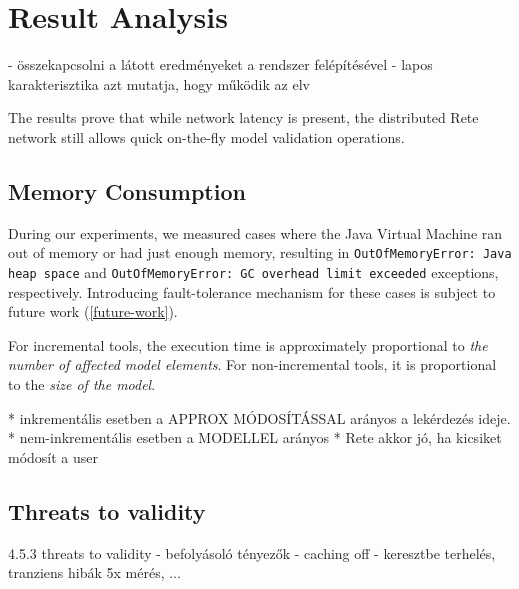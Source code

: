  






 



\section{Result Analysis}



- összekapcsolni a látott eredményeket a rendszer felépítésével
- lapos karakterisztika azt mutatja, hogy működik az elv

The results prove that while network latency is present, the distributed Rete network still allows quick on-the-fly model validation operations. 

\subsection{Memory Consumption}

During our experiments, we measured cases where the Java Virtual Machine ran out of memory or had just enough memory, resulting in \texttt{OutOfMemoryError: Java heap space} and \texttt{OutOfMemoryError: GC overhead limit exceeded} exceptions, respectively. Introducing fault-tolerance mechanism for these cases is subject to future work (\autoref{future-work}).  
  
For incremental tools, the execution time is approximately proportional to \emph{the number of affected model elements}. For non-incremental tools, it is proportional to the \emph{size of the model}. 



* inkrementális esetben a APPROX MÓDOSÍTÁSSAL arányos a lekérdezés ideje.
* nem-inkrementális esetben a MODELLEL arányos
* Rete akkor jó, ha kicsiket módosít a user


% 
% 
% 
% 

\subsection{Threats to validity}
\label{threats-to-validity}

4.5.3 threats to validity
  - befolyásoló tényezők
    - caching off
    - keresztbe terhelés, tranziens hibák 5x mérés, ...
